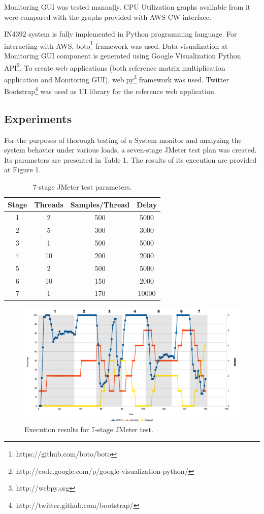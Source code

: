 \documentclass[conference]{IEEEtran}
\begin{document}
Monitoring GUI was tested manually. CPU Utilization graphs available from it were compared with the graphs provided with AWS CW interface.

IN4392 system is fully implemented in Python programming language. For interacting with AWS, boto\footnote{https://github.com/boto/boto} framework was used. Data visualization at Monitoring GUI component is generated using Google Visualization Python API\footnote{http://code.google.com/p/google-visualization-python/}. To create web applications (both reference matrix multiplication application and Monitoring GUI), web.py\footnote{http://webpy.org} framework was used. Twitter Bootstrap\footnote{http://twitter.github.com/bootstrap/} was used as UI library for the reference web application.

\subsection{Experiments}

For the purposes of thorough testing of a System monitor and analyzing the system behavior under various loads, a seven-stage JMeter test plan was created. Its parameters are presented in Table 1. The results of its execution are provided at Figure 1.

\begin{table}[ht]
\begin{center}
  \begin{tabular}{ | c | c | c | c | }
    \hline
    \textbf{Stage} & \textbf{Threads} & \textbf{Samples/Thread} & \textbf{Delay} \\ \hline
    1 & 2 & 500 & 5000 \\ \hline
    2 & 5 & 300 & 3000 \\ \hline
    3 & 1 & 500 & 5000 \\ \hline
    4 & 10 & 200 & 2000 \\ \hline
    5 & 2 & 500 & 5000 \\ \hline
    6 & 10 & 150 & 2000 \\ \hline
    7 & 1 & 170 & 10000 \\
    \hline
  \end{tabular}
  \caption{7-stage JMeter test parameters.}
\end{center}
\end{table}

\begin{figure}
\centering
\includegraphics[width=180mm]{big_chart.png}
\caption{Execution results for 7-stage JMeter test.}
\label{fig_sim}
\end{figure}
\end{document}
